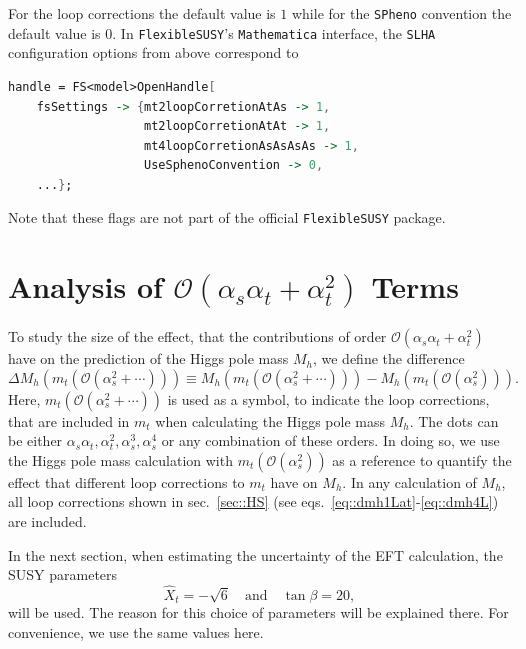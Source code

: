 \documentclass[a4paper,12pt]{book}
\begin{document}
For the loop corrections the default value is $1$ while for the \texttt{SPheno} convention the default value is $0$. In \texttt{FlexibleSUSY}'s \texttt{Mathematica} interface, the \texttt{SLHA} configuration options from above correspond to
\begin{center}
%
\begin{lstlisting}[language=Mathematica,numbers=none]
handle = FS<model>OpenHandle[
    fsSettings -> {mt2loopCorretionAtAs -> 1,
                   mt2loopCorretionAtAt -> 1,
                   mt4loopCorretionAsAsAsAs -> 1,
                   UseSphenoConvention -> 0,
    ...};
\end{lstlisting}

\end{center}
Note that these flags are not part of the official \texttt{FlexibleSUSY} package.
\section{Analysis of $\mathcal{O}(\alpha_s \alpha_t+\alpha_t^2)$ Terms}
\label{sec::analysis}
To study the size of the effect, that the contributions of order $\mathcal{O}(\alpha_s\alpha_t + \alpha_t^2)$ have on the prediction of the Higgs pole mass $M_h$, we define the difference
\begin{equation}
\label{eq::DMhas2}
\Delta M_h(m_t(\mathcal{O}(\alpha_s^2 +\cdots))) \equiv M_h(m_t(\mathcal{O}(\alpha_s^2 +\cdots)))-M_h(m_t(\mathcal{O}(\alpha_s^2))).
\end{equation}
Here, $m_t(\mathcal{O}(\alpha_s^2 +\cdots))$ is used as a symbol, to indicate the loop corrections, that are included in $m_t$ when calculating the Higgs pole mass $M_h$. The dots can be either $\alpha_s\alpha_t,\alpha_t^2,\alpha_s^3,\alpha_s^4$ or any combination of these orders. In doing so, we use the Higgs pole mass calculation with $m_t(\mathcal{O}(\alpha_s^2))$ as a reference to quantify the effect that different loop corrections to $m_t$ have on $M_h$. In any calculation of $M_h$, all loop corrections shown in sec.\ \ref{sec::HS} (see eqs.\ \eqref{eq::dmh1Lat}-\eqref{eq::dmh4L}) are included.\par
In the next section, when estimating the uncertainty of the EFT calculation, the SUSY parameters
\begin{equation}
 \hat{X}_t=-\sqrt{6} \quad  \text{and} \quad  \tan\beta=20,
\end{equation}
will be used. The reason for this choice of parameters will be explained there. For convenience, we use the same values here.\par 
\end{document}
